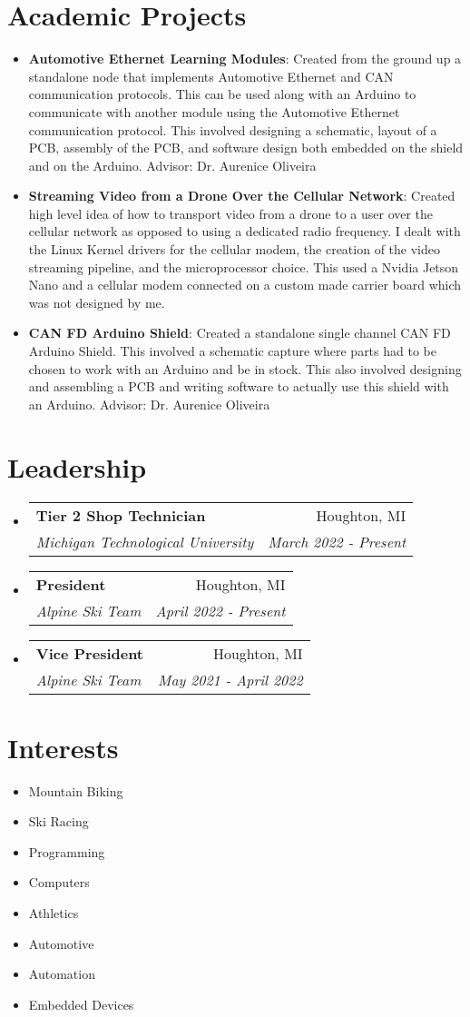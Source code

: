 \documentclass[letterpaper,10.8pt]{article}
\makeatletter
\newcommand{\resumeItem}[2]{
  \item\small{
    \textbf{#1}{: #2 \vspace{-2pt}}
  }
}
\newcommand{\resumeSubheading}[4]{
  \vspace{-1pt}\item
    \begin{tabular*}{0.97\textwidth}{l@{\extracolsep{\fill}}r}
      \textbf{#1} & #2 \\
      \textit{\small#3} & \textit{\small #4} \\
    \end{tabular*}\vspace{-5pt}
}
\newcommand{\resumeSubItem}[2]{\resumeItem{#1}{#2}\vspace{-4pt}}
\newcommand{\resumeSkill}{\item\small\textbf{}}
\newcommand{\resumeSubHeadingListStart}{\begin{itemize}[leftmargin=*]}
\newcommand{\resumeSubHeadingListEnd}{\end{itemize}}
\newcommand{\resumeSkillsListStart}{\setlength\multicolsep{0pt}\begin{multicols}{3}\begin{itemize}[leftmargin=*,nolistsep]}
\newcommand{\resumeSkillsListEnd}{\end{itemize}\end{multicols}}
\makeatother
\begin{document}
\section{Academic Projects}
\resumeSubHeadingListStart
\resumeSubItem{Automotive Ethernet Learning Modules}{Created from the ground up a standalone node that implements Automotive Ethernet and CAN communication protocols.  This can be used along with an Arduino to communicate with another module using the Automotive Ethernet communication protocol. This involved designing a schematic, layout of a PCB, assembly of the PCB, and software design both embedded on the shield and on the Arduino. Advisor: Dr. Aurenice Oliveira}
\resumeSubItem{Streaming Video from a Drone Over the Cellular Network}{Created high level idea of how to transport video from a drone to a user over the cellular network as opposed to using a dedicated radio frequency.  I dealt with the Linux Kernel drivers for the cellular modem, the creation of the video streaming pipeline, and the microprocessor choice.  This used a Nvidia Jetson Nano and a cellular modem connected on a custom made carrier board which was not designed by me.}
\resumeSubItem{CAN FD Arduino Shield}{Created a standalone single channel CAN FD Arduino Shield.  This involved a schematic capture where parts had to be chosen to work with an Arduino and be in stock.  This also involved designing and assembling a PCB and writing software to actually use this shield with an Arduino. Advisor: Dr. Aurenice Oliveira } 
\resumeSubHeadingListEnd

\section{Leadership}
\resumeSubHeadingListStart
\resumeSubheading
{Tier 2 Shop Technician}{Houghton, MI}
{Michigan Technological University}{March 2022 - Present}
\resumeSubheading
{President}{Houghton, MI}
{Alpine Ski Team}{April 2022 - Present}
\resumeSubheading
{Vice President}{Houghton, MI}
{Alpine Ski Team}{May 2021 - April 2022}
\resumeSubHeadingListEnd

\section{Interests}
\resumeSkillsListStart
\resumeSkill Mountain Biking 
\resumeSkill Ski Racing
\resumeSkill Programming
\resumeSkill Computers
\resumeSkill Athletics
\resumeSkill Automotive
\resumeSkill Automation
\resumeSkill Embedded Devices
\resumeSkillsListEnd
\end{document}
